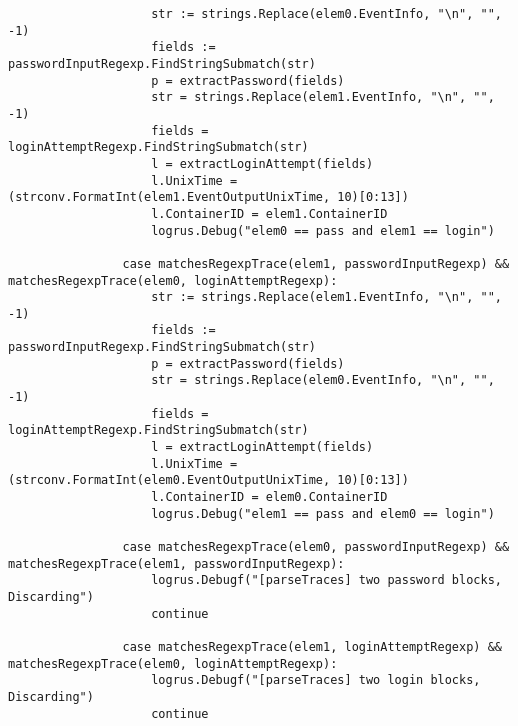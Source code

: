\begin{verbatim}
                    str := strings.Replace(elem0.EventInfo, "\n", "", -1)
                    fields := passwordInputRegexp.FindStringSubmatch(str)
                    p = extractPassword(fields)
                    str = strings.Replace(elem1.EventInfo, "\n", "", -1)
                    fields = loginAttemptRegexp.FindStringSubmatch(str)
                    l = extractLoginAttempt(fields)
                    l.UnixTime = (strconv.FormatInt(elem1.EventOutputUnixTime, 10)[0:13])
                    l.ContainerID = elem1.ContainerID
                    logrus.Debug("elem0 == pass and elem1 == login")
    
                case matchesRegexpTrace(elem1, passwordInputRegexp) && matchesRegexpTrace(elem0, loginAttemptRegexp):
                    str := strings.Replace(elem1.EventInfo, "\n", "", -1)
                    fields := passwordInputRegexp.FindStringSubmatch(str)
                    p = extractPassword(fields)
                    str = strings.Replace(elem0.EventInfo, "\n", "", -1)
                    fields = loginAttemptRegexp.FindStringSubmatch(str)
                    l = extractLoginAttempt(fields)
                    l.UnixTime = (strconv.FormatInt(elem0.EventOutputUnixTime, 10)[0:13])
                    l.ContainerID = elem0.ContainerID
                    logrus.Debug("elem1 == pass and elem0 == login")
    
                case matchesRegexpTrace(elem0, passwordInputRegexp) && matchesRegexpTrace(elem1, passwordInputRegexp):
                    logrus.Debugf("[parseTraces] two password blocks, Discarding")
                    continue
    
                case matchesRegexpTrace(elem1, loginAttemptRegexp) && matchesRegexpTrace(elem0, loginAttemptRegexp):
                    logrus.Debugf("[parseTraces] two login blocks, Discarding")
                    continue
    

\end{verbatim}

